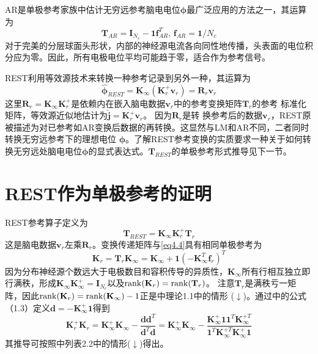 AR是单极参考家族中估计无穷远参考脑电电位$\mathbf{\phi}$最广泛应用的方法之一，其运算为
\begin{equation}\label{eq4.5}
\mathbf{T}_{AR}=\mathbf{I}_{N_c}-\mathbf{1f}_{AR}^T,\,\mathbf{f}_{AR}=\mathbf{1}/{N_c}
\end{equation}
对于完美的分层球面头形状，内部的神经源电流各向同性地传播，头表面的电位积分应为零。因此，所有电极电位平均可能趋于零，适合作为参考信号。

REST利用等效源技术来转换一种参考记录到另外一种，其运算为
\begin{equation}\label{eq4.6}
\hat{\mathbf{\phi}}_{REST}=\mathbf{K}_{\infty}(\mathbf{K}_r^+\mathbf{v}_r)=\mathbf{R}_r\mathbf{v}_r
\end{equation}
这里$\mathbf{R}_r=\mathbf{K}_{\infty}\mathbf{K}_r^+$是依赖内在嵌入脑电数据$\mathbf{v}_r$中的参考变换矩阵$\mathbf{T}_r$的参考
标准化矩阵，等效源近似地估计为$\hat{\mathbf{j}}=\mathbf{K}_r^+\mathbf{v}_r$。 因为$\mathbf{R}_r$是转
换参考后的数据$\mathbf{v}_r$，REST原被描述为对已参考如AR变换后数据的再转换。这显然与LM和AR不同，二者同时转换无穷远参考下的理想电位
$\mathbf{\phi}$。了解REST参考变换的实质要求一种关于如何转换无穷远处脑电电位$\mathbf{\phi}$的显式表达式。$\mathbf{T}_{REST}$的单极参考形式推导见下一节。

\section{REST作为单极参考的证明}\label{RESTasUR}
REST参考算子定义为
\begin{equation}\label{eq4.7}
\mathbf{T}_{REST}=\mathbf{K}_{\infty}\mathbf{K}_r^+\mathbf{T}_r
\end{equation}
这是脑电数据$\mathbf{v}_r$左乘$\mathbf{R}_r$。变换传递矩阵与\eqref{eq4.4}具有相同单极参考为
\begin{equation}\label{eq4.8}
\mathbf{K}_{r}=\mathbf{T}_r\mathbf{K}_{\infty}=\mathbf{K}_{\infty}+\mathbf{1}(\mathbf{-K}_{\infty}^T\mathbf{f}_r)^T
\end{equation}
因为分布神经源个数远大于电极数目和容积传导的异质性，$\mathbf{K}_{\infty}$所有行相互独立即行满秩，形成$\mathbf{K}_{\infty}\mathbf{K}_{\infty}^+=\mathbf{I}_{N_c}$以及$\operatorname{rank}(\mathbf{K}_r)=\operatorname{rank}(\mathbf{T}_r)$。 注意$\mathbf{T}_r$是满秩亏一矩阵，因此$\operatorname{rank}(\mathbf{K}_r)=\operatorname{rank}(\mathbf{K}_{\infty})-1$正是\cite{baksalary_revisitation_2003}中理论1.1中的情形 ($\downarrow$)。通过\cite{baksalary_revisitation_2003}中的公式（1.3）定义$\mathbf{d}=-\mathbf{K}_{\infty}^+\mathbf{1}$得到
\begin{equation}\label{eq4.9}
\mathbf{K}_{r}^+\mathbf{K}_{r}=\mathbf{K}_{\infty}^+\mathbf{K}_{\infty}-\frac{\mathbf{dd}^T}{{\mathbf{d}^T\mathbf{d}}}=\mathbf{K}_{\infty}^+\mathbf{K}_{\infty}-\frac{\mathbf{K}_{\infty}^+\mathbf{11}^T\mathbf{K}_{\infty}^{+T}}{{\mathbf{1}^T\mathbf{K}_{\infty}^{+T}\mathbf{K}_{\infty}^+\mathbf{1}}}
\end{equation}
其推导可按照\cite{baksalary_revisitation_2003}中列表2.2中的情形($\downarrow$)得出。

